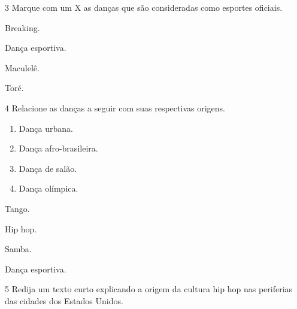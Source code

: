 
\num{3}  Marque com um X as danças que são consideradas como esportes oficiais.

\begin{boxlist}
 Breaking.

 Dança esportiva.

\boxitem{} Maculelê.

\boxitem{} Toré.
\end{boxlist}


\num{4}  Relacione as danças a seguir com suas respectivas origens.

\begin{enumerate}
\item Dança urbana.

\item Dança afro-brasileira.

\item Dança de salão.

\item Dança olímpica.
\end{enumerate}

\begin{boxlist}
 Tango.

 Hip hop.

 Samba.

 Dança esportiva.
\end{boxlist}


\num{5} Redija um texto curto explicando a origem da cultura hip hop
nas periferias das cidades dos Estados Unidos.



